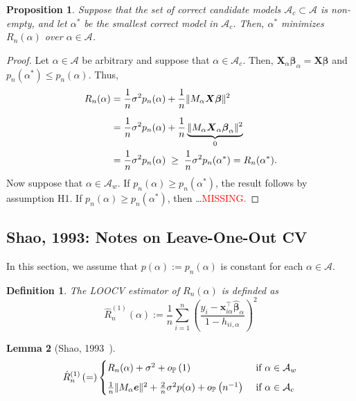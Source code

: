 \documentclass[12pt, letter paper]{article}
\newcommand{\1}{\mathmybb{1}}
\newtheorem{definition}{Definition}[section]
\newtheorem{proposition}{Proposition}[section]
\newtheorem{lemma}[proposition]{Lemma}
\newcommand{\0}{\emptyset}
\newcommand{\prob}{\mathbb{P}}
\newcommand{\paren}[1]{\left(#1 \right)}
\newcommand{\norm}[1]{|\hspace{-1pt}|#1 |\hspace{-1pt}|}
\newcommand{\normsq}[1]{\norm{#1}^{2}}
\newcommand{\Acal}{\mathcal{A}}
\newcommand{\X}{\boldsymbol{X}}
\newcommand{\x}{\boldsymbol{x}}
\newcommand{\e}{\boldsymbol{e}}
\newcommand{\bbeta}{\boldsymbol{\beta}}
\newcommand{\bbetahat}{\boldsymbol{\hat{\beta}}}
\newcommand{\loocv}[1]{\hat{R}^{(1)}_{n}\paren{#1}}
\newcommand{\op}[1]{o_{\prob}\paren{#1}}
\begin{document}
\begin{proposition}
    Suppose that the set of correct candidate models \(\Acal_{c}\subset\Acal\) is non-empty, and let \(\alpha^{*}\) be the smallest correct model in \(\Acal_{c}\). Then, \(\alpha^{*}\) minimizes \(R_{n}(\alpha)\) over \(\alpha\in\Acal\).
\end{proposition}

\begin{proof}
    Let \(\alpha\in\Acal\) be arbitrary and suppose that \(\alpha\in\Acal_{c}\). Then, \(\X_{\alpha}\bbeta_{\alpha} = \X\bbeta\) and \(p_{n}(\alpha^{*})\leq p_{n}(\alpha)\). Thus,
    \begin{align*}
        R_{n}(\alpha) &= \frac{1}{n}\sigma^{2}p_{n}(\alpha) + \frac{1}{n}\normsq{M_{\alpha}\X\bbeta}\\[2mm]
        &= \frac{1}{n} \sigma^{2}p_{n}(\alpha) + \frac{1}{n}\underbrace{\normsq{M_{\alpha}\X_{\alpha}\bbeta_{\alpha}}}_{0}\\
        &= \frac{1}{n}\sigma^{2}p_{n}(\alpha)\; \geq \; \frac{1}{n}\sigma^{2}p_{n}(\alpha^{*}) = R_{n}(\alpha^{*}).
    \end{align*}
    Now suppose that \(\alpha\in\Acal_{w}\). If \(p_{n}(\alpha)\geq p_{n}(\alpha^{*})\), the result follows by assumption H1. If \(p_{n}(\alpha)\geq p_{n}(\alpha^{*})\), then \ldots \textcolor{red}{MISSING.}
\end{proof}

\subsection{Shao, 1993: Notes on Leave-One-Out CV}
In this section, we assume that \(p(\alpha):=p_n(\alpha)\) is constant for each \(\alpha\in\Acal\).
\begin{definition}
    The LOOCV estimator of \(R_{n}(\alpha)\) is definded as
    \[\loocv{\alpha}:= \frac{1}{n}\sum_{i=1}^{n}\paren{\frac{y_{i}-\x_{i\alpha}^{\top}\bbetahat_{\alpha}}{1-h_{ii,\alpha}}}^{2}\]
\end{definition}

\begin{lemma}[Shao, 1993~\cite{shao_1993}]
    \[\loocv = \begin{cases}
        R_{n}(\alpha) + \sigma^{2} + \op{1} &\text{ if }\alpha\in\Acal_{w}\\[2mm]
        \frac{1}{n}\normsq{M_{\alpha}\e} + \frac{2}{n}\sigma^{2}p(\alpha) + \op{n^{-1}} &\text{ if }\alpha\in\Acal_{c}
    \end{cases}\]
\end{lemma}
\end{document}
